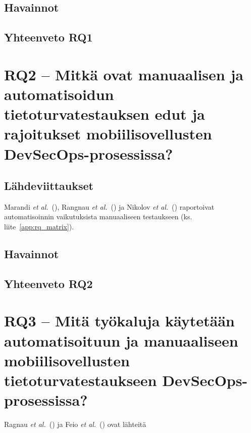 \documentclass[bscthesis,finnish,oneside,biblatex]{uefcsthesis}
\begin{document}
\subsection{Havainnot}

\subsection{Yhteenveto RQ1}

\section{RQ2 – Mitkä ovat manuaalisen ja automatisoidun tietoturvatestauksen edut ja rajoitukset mobiilisovellusten DevSecOps-prosessissa?}
\label{sec:rq2}

\subsection{Lähdeviittaukset}
Marandi \emph{et al.}\ (\citeyear{marandi2023_ias}),
Rangnau \emph{et al.}\ (\citeyear{putra2022_devsecops}) ja
Nikolov \emph{et al.}\ (\citeyear{rangnau2020_cst}) raportoivat automatisoinnin
vaikutuksista manuaaliseen testaukseen (ks. liite~\ref{app:rq_matrix}).

\subsection{Havainnot}

\subsection{Yhteenveto RQ2}

\section{RQ3 – Mitä työkaluja käytetään automatisoituun ja manuaaliseen mobiilisovellusten tietoturvatestaukseen DevSecOps-prosessissa?}
\label{sec:rq3}

Ragnau \emph{et al.}\ (\citeyear{rangnau2020_cst}) ja
Feio \emph{et al.}\ (\citeyear{feio2024_empirical}) ovat lähteitä
\end{document}

